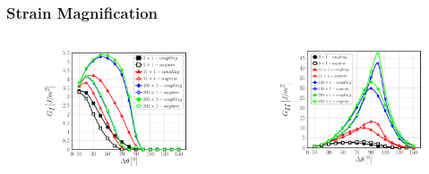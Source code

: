 \documentclass[first,firstsupp,lastsupp,last,hyperref,table]{ETHclass}
\begin{document}
\begin{frame}
\frametitle{\vspace{0.2cm}\small Strain Magnification}
\vspace{-1cm}
\centering
\begin{columns}[c]
\centering
\begin{column}{0.5\textwidth}
\centering
\begin{figure}
\centering
\includegraphics[width=\columnwidth]{nx1-coupling-vf60-GI-strainmagn201.pdf}
\end{figure}
\end{column}
\begin{column}{0.5\textwidth}
\centering
\begin{figure}
\centering
\includegraphics[width=\columnwidth]{nx1-coupling-vf60-GII-strainmagn201.pdf}

\end{figure}
\end{column}
\end{columns}
\end{frame}
\end{document}
